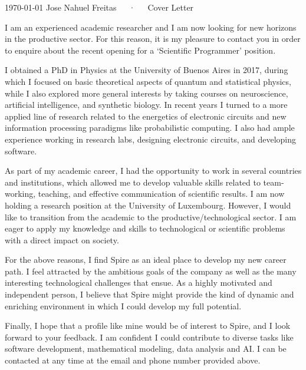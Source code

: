 \documentclass[11pt, a4paper]{awesome-cv}
\begin{document}
\makecvheader[R]

\makecvfooter
  {\today}
  {Jose Nahuel Freitas~~~·~~~Cover Letter}
  {}

\makelettertitle

\begin{cvletter}
  I am an experienced academic researcher and I am now looking for new
  horizons in the productive sector. For this reason, it is my pleasure to contact
  you in order to enquire about the recent opening for a `Scientific Programmer'
  position.

  I obtained a PhD in Physics at the University of Buenos Aires in 2017,
  during which I focused on basic theoretical
  aspects of quantum and statistical physics, while I also explored more general
  interests by taking courses on neuroscience, artificial intelligence, and synthetic
  biology. In recent years I turned to a more applied line of research related to
  the energetics of electronic circuits and new information processing paradigms
  like probabilistic computing. I also had ample experience working in research
  labs, designing electronic circuits, and developing software.

  As part of my academic career, I had the opportunity to work in several countries
  and institutions, which allowed me to develop valuable skills related to team-working,
  teaching, and effective communication of scientific results. I am now holding a
  research position at the University of Luxembourg. However, I would like to
  transition from the academic to the productive/technological sector. I am
  eager to apply my knowledge and skills to technological or scientific problems
  with a direct impact on society.

  For the above reasons, I find Spire as an ideal place to develop my new career
  path. I feel attracted by the ambitious goals of the company as well as the many
  interesting technological challenges that ensue. As a highly motivated and
  independent person, I believe that Spire might provide the kind of dynamic
  and enriching environment in which I could develop my full potential.

  Finally, I hope that a profile like mine would be of interest to Spire, and I
  look forward to your feedback. I am confident I could contribute to diverse
  tasks like software development, mathematical modeling, data analysis and AI.
  I can be contacted at any time at the email and phone number provided above.


\end{cvletter}


\makeletterclosing
\end{document}

